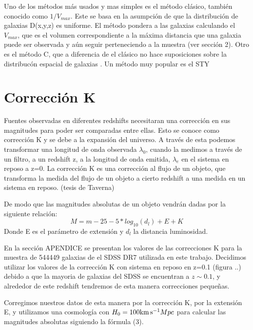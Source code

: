 \documentclass[a4paper,10pt]{article}
\newcommand{\kms}{{\rm km\,s^{-1}}}
\begin{document}
Uno de los m\'etodos m\'as usados y mas simples es el m\'etodo cl\'asico, tambi\'en conocido como $1/V_{max}$.  Este se basa en la asumpci\'on de que la distribuci\'on de galaxias D(x,y,z) es uniforme. El m\'etodo pondera a las galaxias calculando el $V_{max}$, que es el volumen correspondiente a la m\'axima distancia que una galaxia puede ser observada y a\'un seguir perteneciendo a la muestra (ver secci\'on 2). Otro es el m\'etodo C, que a diferencia de el cl\'asico no hace suposiciones sobre la distribuc\'on espacial de galaxias \citep{Lynden-Bell1971}. Un m\'etodo muy popular es el STY  




\section{Correcci\'on K}
Fuentes observadas en diferentes redshifts necesitaran una correcci\'on en sus magnitudes para poder ser comparadas entre ellas. Esto se conoce como correcci\'on K y se debe a la expansi\'on del universo. A trav\'es de esta podemos transformar una longitud de onda observada $\lambda_{0}$, cuando la medimos a trav\'es de un filtro, a un redshift z, a la longitud de onda emitida, $\lambda_{e}$ en el sistema en reposo a z=0. La correcci\'on K es una correcci\'on al flujo de un objeto, que transforma la medida del flujo de un objeto a cierto redshift a una medida en un sistema en reposo. (tesis de Taverna)

De modo que las magnitudes absolutas de un objeto vendr\'an dadas por la siguiente relaci\'on: 
\begin{equation}
M = m - 25 - 5*log_{10}(d_{l}) + E + K 
\end{equation}
Donde E es el par\'ametro de extensi\'on y $d_{l}$ la distancia luminosidad.

En la secci\'on APENDICE se presentan los valores de las correcciones K para la muestra de 544449 galaxias de el SDSS DR7 \citep{SDSS} \citep{Abazajian2009} utilizada en este trabajo. Decidimos utilizar los valores de la correcci\'on K con sistema en reposo en z=0.1 (figura ..) debido a que la mayoria de galaxias del SDSS se encuentran a $z\sim0.1$, y alrededor de este redshift tendremos de esta manera correcciones pequeñas. 

Corregimos nuestros datos de esta manera por la correcci\'on K, por la extensi\'on E, y utilizamos una cosmolog\'ia con $H_{0}=100\kms Mpc$ para calcular las magnitudes absolutas siguiendo la f\'ormula (3).
\end{document}

